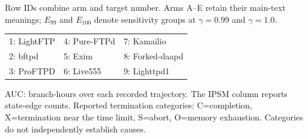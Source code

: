 \begingroup
\small
\setlength{\tabcolsep}{1.6pt}
\renewcommand{\arraystretch}{1.0}
\noindent Row IDs combine arm and target number. Arms A--E retain their main-text meanings; $E_{99}$ and $E_{100}$ denote sensitivity groups at $\gamma=0.99$ and $\gamma=1.0$.
\par\smallskip
\noindent\begin{tabularx}{\columnwidth}{@{}YYY@{}}
1: LightFTP & 4: Pure-FTPd & 7: Kamailio \\
2: bftpd & 5: Exim & 8: Forked-daapd \\
3: ProFTPD & 6: Live555 & 9: Lighttpd1 \\
\end{tabularx}
\par\smallskip
\noindent AUC: branch-hours over each recorded trajectory. The IPSM column reports state-edge counts. Reported termination categories: C=completion, X=termination near the time limit, S=abort, O=memory exhaustion. Categories do not independently establish causes.
\par\smallskip
{}
\label{tab:archive_arms}
\tabletail{\bottomrule}
\tablelasttail{\bottomrule}
